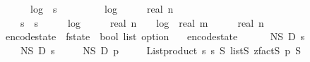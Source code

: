 \begin{isabellebody}
\ \ \ \ {}\ {\isacharasterisk}{\kern0pt}\ log\ {}\ {\isacharparenleft}{\kern0pt}s\ {\isacharplus}{\kern0pt}\ {}{\isacharparenright}{\kern0pt}\ {\isacharplus}{\kern0pt}\isanewline
\ \ \ \ {}\ {\isacharasterisk}{\kern0pt}\ log\ {}\ {\isacharparenleft}{\kern0pt}{}\ {\isacharplus}{\kern0pt}\ {}\ {\isacharasterisk}{\kern0pt}\ real\ n{\isacharparenright}{\kern0pt}\ {\isacharplus}{\kern0pt}\isanewline
\ \ \ \ s\ {\isacharasterisk}{\kern0pt}\ s\ {\isacharasterisk}{\kern0pt}\ {\isacharparenleft}{\kern0pt}{}{}\ {\isacharplus}{\kern0pt}\ {}\ {\isacharasterisk}{\kern0pt}\ log\ {}\ {\isacharparenleft}{\kern0pt}{}\ {\isacharplus}{\kern0pt}\ {}\ {\isacharasterisk}{\kern0pt}\ real\ n{\isacharparenright}{\kern0pt}\ {\isacharplus}{\kern0pt}\ {}\ {\isacharasterisk}{\kern0pt}\ log\ {}\ {\isacharparenleft}{\kern0pt}real\ m\ {\isacharasterisk}{\kern0pt}\ {\isacharparenleft}{\kern0pt}{}\ {\isacharplus}{\kern0pt}\ {}\ {\isacharasterisk}{\kern0pt}\ real\ n{\isacharparenright}{\kern0pt}\ {\isacharplus}{\kern0pt}\ {}\ {\isacharparenright}{\kern0pt}{\isacharparenright}{\kern0pt}{\isacharparenright}{\kern0pt}{\isachardoublequoteclose}\isanewline
\isanewline
{}\isamarkupfalse%
\ encode{\isacharunderscore}{\kern0pt}state\ {\isacharcolon}{\kern0pt}{\isacharcolon}{\kern0pt}\ {\isachardoublequoteopen}f{}{\isacharunderscore}{\kern0pt}state\ {\isasymRightarrow}\ bool\ list\ option{\isachardoublequoteclose}\ \isanewline
\ \ {\isachardoublequoteopen}encode{\isacharunderscore}{\kern0pt}state\ {\isacharequal}{\kern0pt}\ \isanewline
\ \ \ \ N\isactrlsub S\ {\isasymtimes}\isactrlsub D\ {\isacharparenleft}{\kern0pt}{\isasymlambda}s\ \isanewline
\ \ \ \ N\isactrlsub S\ {\isasymtimes}\isactrlsub D\ {\isacharparenleft}{\kern0pt}{\isasymlambda}s\ \isanewline
\ \ \ \ N\isactrlsub S\ {\isasymtimes}\isactrlsub D\ {\isacharparenleft}{\kern0pt}{\isasymlambda}p{\isachardot}{\kern0pt}\ \isanewline
\ \ \ \ {\isacharparenleft}{\kern0pt}List{\isachardot}{\kern0pt}product\ {\isacharbrackleft}{\kern0pt}{}{\isachardot}{\kern0pt}{\isachardot}{\kern0pt}{\isacharless}{\kern0pt}s\ {\isacharbrackleft}{\kern0pt}{}{\isachardot}{\kern0pt}{\isachardot}{\kern0pt}{\isacharless}{\kern0pt}s\ {\isasymrightarrow}\isactrlsub S\ {\isacharparenleft}{\kern0pt}list\isactrlsub S\ {\isacharparenleft}{\kern0pt}zfact\isactrlsub S\ p{\isacharparenright}{\kern0pt}{\isacharparenright}{\kern0pt}{\isacharparenright}{\kern0pt}\ {\isasymtimes}\isactrlsub S\isanewline

\end{isabellebody}
